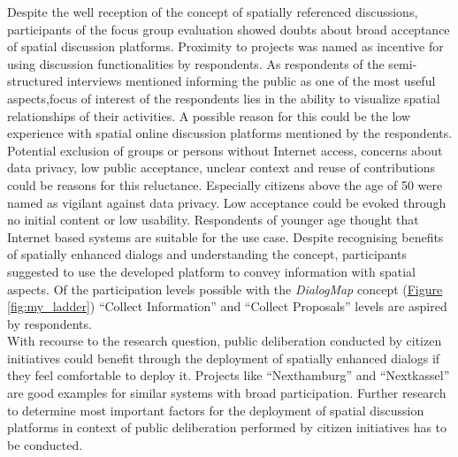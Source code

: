 Despite the well reception of the concept of spatially referenced discussions, participants of the focus group evaluation showed doubts about broad acceptance of spatial discussion platforms. Proximity to projects was named as incentive for using discussion functionalities by respondents. As respondents of the semi-structured interviews mentioned informing the public as one of the most useful aspects,focus of interest of the respondents lies in the ability to visualize spatial relationships of their activities. A possible reason for this could be the low experience with spatial online discussion platforms mentioned by the respondents.\\
Potential exclusion of groups or persons without Internet access, concerns about data privacy, low public acceptance, unclear context and reuse of contributions could be reasons for this reluctance. Especially citizens above the age of 50 were named as vigilant against data privacy. Low acceptance could be evoked through no initial content or low usability. Respondents of younger age thought that Internet based systems are suitable for the use case. Despite recognising benefits of spatially enhanced dialogs and understanding the concept, participants suggested to use the developed platform to convey information with spatial aspects. Of the participation levels possible with the \textit{DialogMap} concept (\hyperref[fig:my_ladder]{Figure \ref{fig:my_ladder}}) ``Collect Information'' and ``Collect Proposals'' levels are aspired by respondents.\\
With recourse to the research question, public deliberation conducted by citizen initiatives could benefit through the deployment of spatially enhanced dialogs if they feel comfortable to deploy it. Projects like ``Nexthamburg'' and ``Nextkassel'' are good examples for similar systems with broad participation. Further research to determine most important factors for the deployment of spatial discussion platforms in context of public deliberation performed by citizen initiatives has to be conducted.



